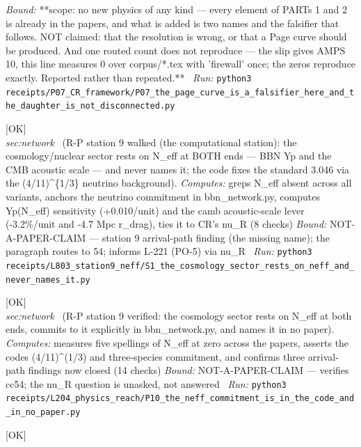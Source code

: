 \begin{description}
 \emph{Bound:} **scope: no new physics of any kind --- every element of PARTs 1 and 2 is already in the papers, and what is added is two names and the falsifier that follows. NOT claimed: that the resolution is wrong, or that a Page curve should be produced.  And one routed count does not reproduce --- the slip gives AMPS 10, this line measures 0 over corpus/*.tex with 'firewall' once; the zeros reproduce exactly. Reported rather than repeated.**
\ \emph{Run:} \texttt{python3 receipts/P07\_CR\_framework/P07\_the\_page\_curve\_is\_a\_falsifier\_here\_and\_the\_daughter\_is\_not\_disconnected.py}
\item[\label{rcpt:S1_the_cosmology_sector_rests_on_neff_and_never_names_it}\texttt{S1\_the\_cosmology\_sector\_rests\_on\_neff\_and\_never\_names\_it}]\hfill\textsf{[OK]}\\
\textit{sec:network} \ (R-P station 9 walked (the computational station): the cosmology/nuclear sector rests on N\_eff at BOTH ends --- BBN Yp and the CMB acoustic scale --- and never names it; the code fixes the standard 3.046 via the (4/11)\textasciicircum{}\{1/3\} neutrino background). 
\emph{Computes:} greps N\_eff absent across all variants, anchors the neutrino commitment in bbn\_network.py, computes Yp(N\_eff) sensitivity (+0.010/unit) and the camb acoustic-scale lever (-3.2\%/unit and -4.7 Mpc r\_drag), ties it to CR's nu\_R (8 checks)
 \emph{Bound:} NOT-A-PAPER-CLAIM --- station 9 arrival-path finding (the missing name); the paragraph routes to 54; informs L-221 (PO-5) via nu\_R
\ \emph{Run:} \texttt{python3 receipts/L803\_station9\_neff/S1\_the\_cosmology\_sector\_rests\_on\_neff\_and\_never\_names\_it.py}
\item[\label{rcpt:P10_the_neff_commitment_is_in_the_code_and_in_no_paper}\texttt{P10\_the\_neff\_commitment\_is\_in\_the\_code\_and\_in\_no\_paper}]\hfill\textsf{[OK]}\\
\textit{sec:network} \ (R-P station 9 verified: the cosmology sector rests on N\_eff at both ends, commits to it explicitly in bbn\_network.py, and names it in no paper). 
\emph{Computes:} measures five spellings of N\_eff at zero across the papers, asserts the codes (4/11)\textasciicircum{}(1/3) and three-species commitment, and confirms three arrival-path findings now closed (14 checks)
 \emph{Bound:} NOT-A-PAPER-CLAIM --- verifies cc54; the nu\_R question is unasked, not answered
\ \emph{Run:} \texttt{python3 receipts/L204\_physics\_reach/P10\_the\_neff\_commitment\_is\_in\_the\_code\_and\_in\_no\_paper.py}
\item[\label{rcpt:P11_CR_fixes_the_place_not_the_couplings}\texttt{P11\_CR\_fixes\_the\_place\_not\_the\_couplings}]\hfill\textsf{[OK]}\\

\end{description}
